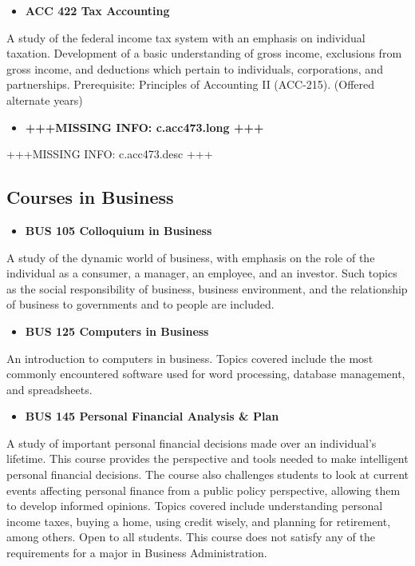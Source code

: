 \documentclass[
  letterpaper,
]{scrbook}
\providecommand{\tightlist}{%
  \setlength{\itemsep}{0pt}\setlength{\parskip}{0pt}}
\begin{document}
\begin{itemize}
\tightlist
\item
  \textbf{ACC 422 Tax Accounting}
\end{itemize}

A study of the federal income tax system with an emphasis on individual
taxation. Development of a basic understanding of gross income,
exclusions from gross income, and deductions which pertain to
individuals, corporations, and partnerships. Prerequisite: Principles of
Accounting II (ACC-215). (Offered alternate years)

\begin{itemize}
\tightlist
\item
  \textbf{+++MISSING INFO: c.acc473.long +++}
\end{itemize}

+++MISSING INFO: c.acc473.desc +++

\subsection{Courses in Business}\label{courses-in-business}

\begin{itemize}
\tightlist
\item
  \textbf{BUS 105 Colloquium in Business}
\end{itemize}

A study of the dynamic world of business, with emphasis on the role of
the individual as a consumer, a manager, an employee, and an investor.
Such topics as the social responsibility of business, business
environment, and the relationship of business to governments and to
people are included.

\begin{itemize}
\tightlist
\item
  \textbf{BUS 125 Computers in Business}
\end{itemize}

An introduction to computers in business. Topics covered include the
most commonly encountered software used for word processing, database
management, and spreadsheets.

\begin{itemize}
\tightlist
\item
  \textbf{BUS 145 Personal Financial Analysis \& Plan}
\end{itemize}

A study of important personal financial decisions made over an
individual's lifetime. This course provides the perspective and tools
needed to make intelligent personal financial decisions. The course also
challenges students to look at current events affecting personal finance
from a public policy perspective, allowing them to develop informed
opinions. Topics covered include understanding personal income taxes,
buying a home, using credit wisely, and planning for retirement, among
others. Open to all students. This course does not satisfy any of the
requirements for a major in Business Administration.
\end{document}
